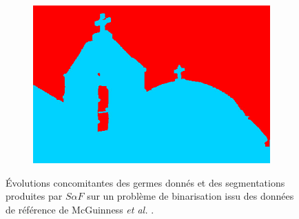 \begin{figure}[htb]
\begin{subfigure}{0.4\textwidth}
 \end{subfigure}
 ~
 \begin{subfigure}{0.4\textwidth}	
\includegraphics[width=\textwidth]{images/evaluation/118035_res3.jpg}
 \end{subfigure}
\caption{Évolutions concomitantes des germes donnés et des segmentations produites par $S \alpha F$ sur un problème de binarisation issu des données de référence de McGuinness \textit{et al.} \cite{mcguinness2010comparative}. }
	\label{fig:eval:Algo-predictability-1}
\end{figure} 

